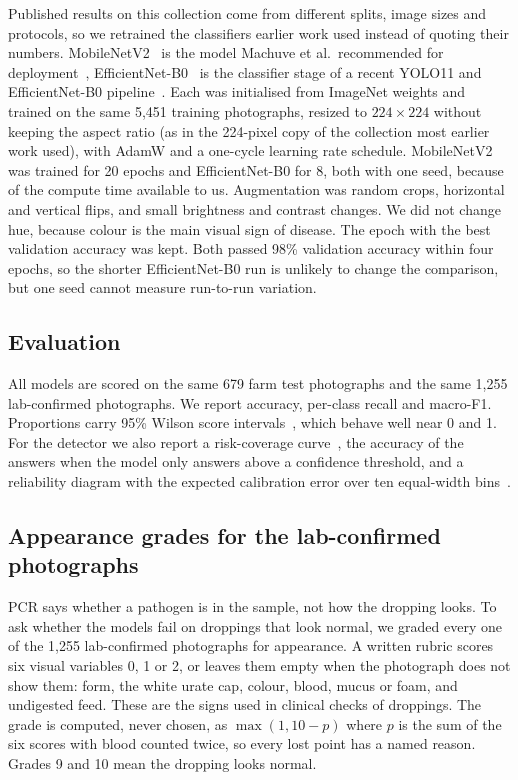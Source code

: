Published results on this collection come from different splits, image sizes and protocols, so we retrained the
classifiers earlier work used instead of quoting their numbers. MobileNetV2~\cite{sandler2018} is the model
Machuve et al.\ recommended for deployment~\cite{machuve2022}, EfficientNet-B0~\cite{tan2019} is the
classifier stage of a recent YOLO11 and EfficientNet-B0 pipeline~\cite{dhungana2025}. Each was
initialised from ImageNet weights and trained on the same 5,451 training photographs, resized to $224\times224$
without keeping the aspect ratio (as in the 224-pixel copy of the collection most earlier work used), with AdamW and a
one-cycle learning rate schedule. MobileNetV2 was trained for 20 epochs and EfficientNet-B0 for 8, both with one seed,
because of the compute time available to us. Augmentation
was random crops, horizontal and vertical flips, and small brightness and contrast changes. We did not change hue,
because colour is the main visual sign of disease. The epoch with the best validation accuracy was kept. Both passed 98\% validation accuracy within four epochs, so the shorter EfficientNet-B0 run is unlikely to change
the comparison, but one seed cannot measure run-to-run variation.

\subsection{Evaluation}
\label{sec:eval}

All models are scored on the same 679 farm test photographs and the same 1,255 lab-confirmed photographs. We report
accuracy, per-class recall and macro-F1. Proportions carry 95\% Wilson score intervals~\cite{wilson1927}, which
behave well near 0 and 1. For the detector we also report a risk-coverage curve~\cite{geifman2017}, the
accuracy of the answers when the model only answers above a confidence threshold, and a reliability diagram with the
expected calibration error over ten equal-width bins~\cite{guo2017}.

\subsection{Appearance grades for the lab-confirmed photographs}
\label{sec:grades}

PCR says whether a pathogen is in the sample, not how the dropping looks. To ask whether the models fail on
droppings that look normal, we graded every one of the 1,255 lab-confirmed photographs for appearance. A written
rubric scores six visual variables 0, 1 or 2, or leaves them empty when the photograph does not show them: form,
the white urate cap, colour, blood, mucus or foam, and undigested feed. These are the signs used in clinical checks
of droppings. The grade is computed, never chosen, as $\max(1, 10 - p)$ where $p$ is the sum of the six scores with
blood counted twice, so every lost point has a named reason. Grades 9 and 10 mean the dropping looks normal.

